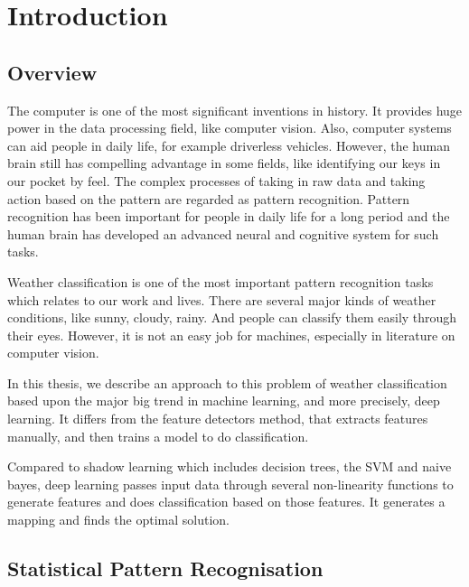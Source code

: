 \chapter{Introduction} %
\label{Chapter1}


\section{Overview}

The computer is one of the most significant inventions in history. It provides huge power in the data processing field, like computer vision. Also, computer systems can aid people in daily life, for example driverless vehicles. However, the human brain still has compelling advantage in some fields, like identifying our keys in our pocket by feel. The complex processes of taking in raw data and taking action based on the pattern are regarded as pattern recognition. Pattern recognition has been important for people in daily life for a long period and the human brain has developed an advanced neural and cognitive system for such tasks.

Weather classification is one of the most important pattern recognition tasks which relates to our work and lives. There are several major kinds of weather conditions, like sunny, cloudy, rainy. And people can classify them easily through their eyes. However, it is not an easy job for machines, especially in literature on computer vision. 

In this thesis, we describe an approach to this problem of weather classification based upon the major big trend in machine learning, and more precisely, deep learning. It differs from the feature detectors method, that extracts features manually, and then trains a model to do classification.  

Compared to shadow learning which includes decision trees, the SVM and naive bayes, deep learning passes input data through several non-linearity functions to generate features and does classification based on those features. It generates a mapping and finds the optimal solution.

\section{Statistical Pattern Recognisation}


